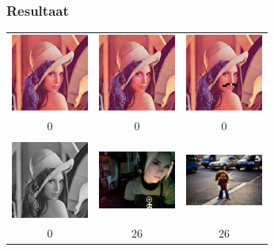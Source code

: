 \documentclass{beamer}
\begin{document}
\begin{frame}
  \frametitle{Resultaat}

  \centering

  \begin{tabular}{ccc}
    \includegraphics[height=1in,width=1in,keepaspectratio]{../images/60.png} &
    \includegraphics[height=1in,width=1in,keepaspectratio]{../images/61.jpg} &
    \includegraphics[height=1in,width=1in,keepaspectratio]{../images/64.jpg} \\
    0 & 0 & 0 \\&&\\
    \includegraphics[height=1in,width=1in,keepaspectratio]{../images/62.jpg} &
    \includegraphics[height=1in,width=1in,keepaspectratio]{../images/25.jpg} &
    \includegraphics[height=1in,width=1in,keepaspectratio]{../images/31.jpg} \\
    0 & 26 & 26
  \end{tabular}

\end{frame}
\end{document}
